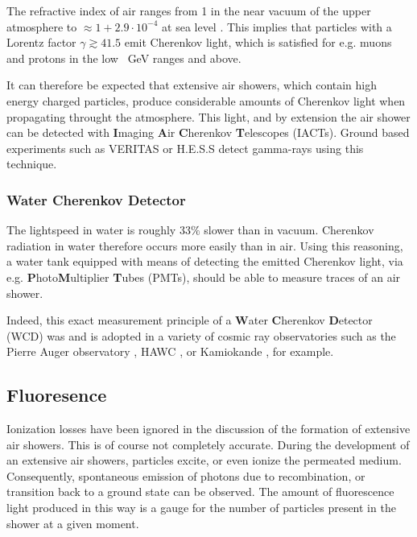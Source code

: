 The refractive index of air ranges from 1 in the near vacuum of the upper atmosphere to $\approx1+2.9\cdot10^{-4}$ at sea level \cite{andrews1992analytical}. This
implies that particles with a Lorentz factor $\gamma \gtrsim 41.5$ emit Cherenkov light, which is satisfied for e.g. muons and protons in the low 
\SI{}{\giga\electronvolt} ranges and above.

It can therefore be expected that extensive air showers, which contain high energy charged particles, produce considerable amounts of Cherenkov light when 
propagating throught the atmosphere. This light, and by extension the air shower can be detected with \textbf{I}maging \textbf{A}ir \textbf{C}herenkov 
\textbf{T}elescopes (IACTs). Ground based experiments such as VERITAS \cite{VeritasTelescope} or H.E.S.S \cite{HessTelescope} detect gamma-rays using this technique.

\subsubsection{Water Cherenkov Detector}

The lightspeed in water is roughly $33\%$ slower than in vacuum. Cherenkov radiation in water therefore occurs more easily than in air. Using this reasoning, a 
water tank equipped with means of detecting the emitted Cherenkov light, via e.g. \textbf{P}hoto\textbf{M}ultiplier \textbf{T}ubes (PMTs), should be able to 
measure traces of an air shower. 

Indeed, this exact measurement principle of a \textbf{W}ater \textbf{C}herenkov \textbf{D}etector (WCD) was and is adopted in a variety of cosmic ray observatories 
such as the Pierre Auger observatory \cite{PierreAugerObservatory}, HAWC \cite{HAWC}, or Kamiokande \cite{Kamiokande}, for example.


\subsection{Fluoresence}
\label{ssec:fluoresence}

Ionization losses have been ignored in the discussion of the formation of extensive air showers. This is of course not completely accurate. During the development of 
an extensive air showers, particles excite, or even ionize the permeated medium. Consequently, spontaneous emission of photons due to recombination, or transition 
back to a ground state can be observed. The amount of fluorescence light produced in this way is a gauge for the number of particles present in the shower at a given
moment.

